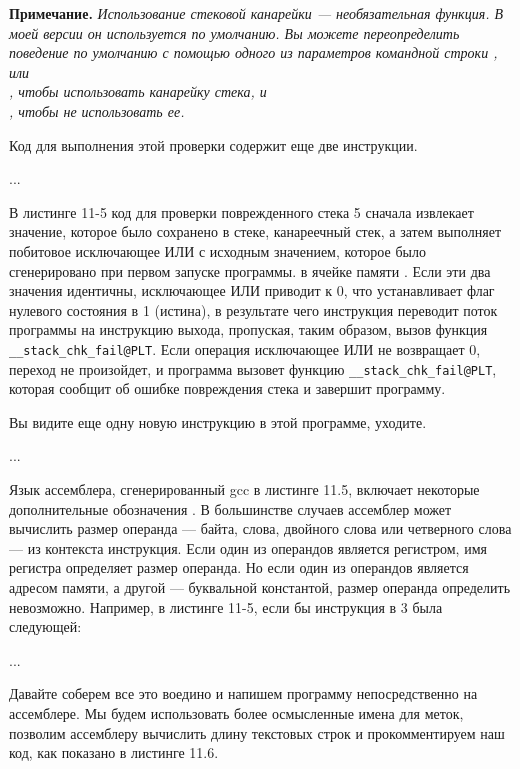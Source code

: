 \textbf{Примечание.}
\textit{Использование стековой канарейки — необязательная функция. В моей версии  он используется по умолчанию. Вы можете переопределить поведение по умолчанию с помощью одного из параметров командной строки ,  или \\ , чтобы использовать канарейку стека, и\\ , чтобы не использовать ее.}

Код для выполнения этой проверки содержит еще две инструкции.

...

В листинге 11-5 код для проверки поврежденного стека 5 сначала извлекает значение, которое было сохранено в стеке, канареечный стек, а затем выполняет побитовое исключающее ИЛИ с исходным значением, которое было сгенерировано при первом запуске программы. в ячейке памяти . Если эти два значения идентичны, исключающее ИЛИ приводит к 0, что устанавливает флаг нулевого состояния  в 1 (истина), в результате чего инструкция  переводит поток программы на инструкцию выхода, пропуская, таким образом, вызов функция \verb|__stack_chk_fail@PLT|. Если операция исключающее ИЛИ не возвращает 0, переход не произойдет, и программа вызовет функцию \verb|__stack_chk_fail@PLT|, которая сообщит об ошибке повреждения стека и завершит программу.

Вы видите еще одну новую инструкцию в этой программе, уходите.

...

Язык ассемблера, сгенерированный gcc в листинге 11.5, включает некоторые дополнительные обозначения . В большинстве случаев ассемблер может вычислить размер операнда — байта, слова, двойного слова или четверного слова — из контекста инструкция. Если один из операндов является регистром, имя регистра определяет размер операнда. Но если один из операндов является адресом памяти, а другой — буквальной константой, размер операнда определить невозможно. Например, в листинге 11-5, если бы инструкция в 3 была следующей:

...

Давайте соберем все это воедино и напишем программу  непосредственно на ассемблере. Мы будем использовать более осмысленные имена для меток, позволим ассемблеру вычислить длину текстовых строк и прокомментируем наш код, как показано в листинге 11.6.

